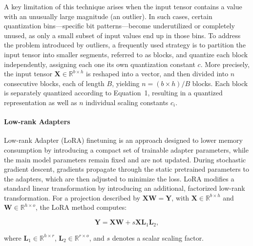 A key limitation of this technique arises when the input tensor contains a value with an unusually large magnitude (an outlier). In such cases, certain quantization bins—specific bit patterns—become underutilized or completely unused, as only a small subset of input values end up in those bins. To address the problem introduced by outliers, a frequently used strategy is to partition the input tensor into smaller segments, referred to as blocks, and quantize each block independently, assigning each one its own quantization constant $c$. More precisely, the input tensor $\mathbf{X}\in \mathbb{R}^{b\times h}$ is reshaped into a vector, and then divided into $n$ consecutive blocks, each of length $B$, yielding ${n = ({b\times h} )/{B} }$ blocks. Each block is separately quantized according to Equation~1, resulting in a quantized representation as well as $n$ individual scaling constants $c_i$.

\paragraph{Low-rank Adapters} Low-rank Adapter (LoRA) finetuning \citep{hu2021lora} is an approach designed to lower memory consumption by introducing a compact set of trainable adapter parameters, while the main model parameters remain fixed and are not updated. During stochastic gradient descent, gradients propagate through the static pretrained parameters to the adapters, which are then adjusted to minimize the loss. LoRA modifies a standard linear transformation by introducing an additional, factorized low-rank transformation. For a projection described by ${\mathbf{X} \mathbf{W} = \mathbf{Y}}$, with $\mathbf{X}\in  \mathbb{R}^{b\times h}$ and $\mathbf{W}\in  \mathbb{R}^{h\times o}$, the LoRA method computes:

\begin{equation}
    \mathbf{Y} = \mathbf{X}\mathbf{W} + s\mathbf{X}\mathbf{L}_1\mathbf{L}_2,
\end{equation}

where $\mathbf{L}_1\in  \mathbb{R}^{h\times r}$, $\mathbf{L}_2\in  \mathbb{R}^{r\times o}$, and $s$ denotes a scalar scaling factor.

